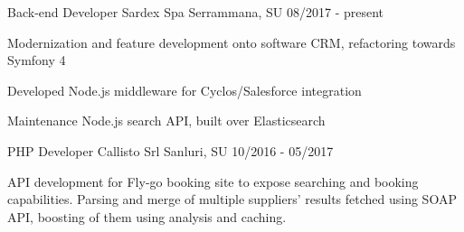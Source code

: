 

\begin{cventries} 

  \cventry
    {Back-end Developer} %
    {Sardex Spa} %
    {Serrammana, SU} %
    {08/2017 - present} %
    {
      \begin{cvitems} %
        \item {Modernization and feature development onto software CRM, refactoring towards Symfony 4}
        \item {Developed Node.js middleware for Cyclos/Salesforce integration}
        \item {Maintenance Node.js search API, built over Elasticsearch}
      \end{cvitems}
    }

  \cventry
    {PHP Developer} %
    {Callisto Srl} %
    {Sanluri, SU} %
    {10/2016 - 05/2017} %
    {
      \begin{cvitems} %
        \item {API development for Fly-go booking site to expose searching and booking capabilities.
        Parsing and merge of multiple suppliers' results fetched using SOAP API, boosting of them using analysis and caching.}
      \end{cvitems}
    }

\end{cventries}
